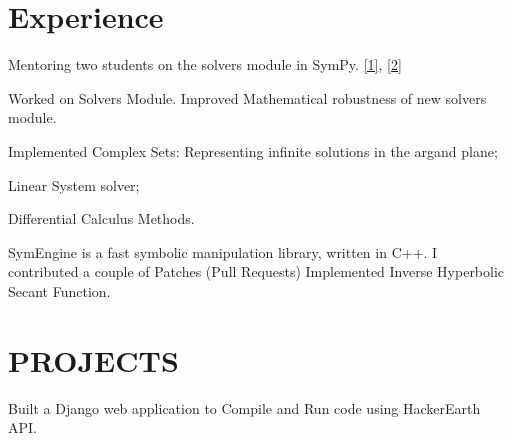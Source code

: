 \documentclass[]{deedy-resume-openfont}
\begin{document}
\begin{minipage}[t]{0.66\textwidth} 


\section{Experience}

\vspace{\topsep} %
\begin{tightemize}\item Mentoring two students on the solvers module in SymPy. \href{https://summerofcode.withgoogle.com/projects/#6299625891823616}{[1]}, 
\href{https://summerofcode.withgoogle.com/projects/#5440294841483264}{[2]}
\end{tightemize}
\sectionsep

\begin{tightemize}
\item Worked on Solvers Module. Improved Mathematical robustness of new solvers module.
\item Implemented Complex Sets: Representing infinite solutions in the argand plane;
\item Linear System solver;
\item Differential Calculus Methods.\end{tightemize}
\sectionsep

\begin{tightemize}
\item SymEngine is a fast symbolic manipulation library, written in C++. I contributed a couple
of Patches (Pull Requests) Implemented Inverse Hyperbolic Secant Function.\end{tightemize}
\sectionsep


\section{PROJECTS}
Built a Django web application to Compile and Run code using HackerEarth API.
\sectionsep


\end{minipage}
\end{document}
